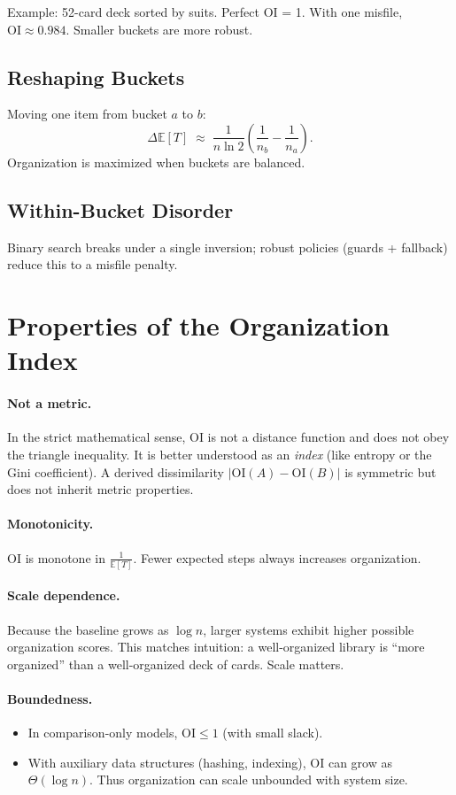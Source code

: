 \documentclass[11pt]{article}
\begin{document}
Example: 52-card deck sorted by suits. Perfect OI = 1. With one misfile,
$\mathrm{OI} \approx 0.984$. Smaller buckets are more robust.

\subsection{Reshaping Buckets}
Moving one item from bucket $a$ to $b$:
\[
\Delta \mathbb{E}[T] \;\approx\; \frac{1}{n\ln 2}
\left(\frac{1}{n_b} - \frac{1}{n_a}\right).
\]
Organization is maximized when buckets are balanced.

\subsection{Within-Bucket Disorder}
Binary search breaks under a single inversion; robust policies (guards +
fallback) reduce this to a misfile penalty.

\section{Properties of the Organization Index}
\paragraph{Not a metric.}
In the strict mathematical sense, $\mathrm{OI}$ is not a distance function and
does not obey the triangle inequality. It is better understood as an \emph{index}
(like entropy or the Gini coefficient). A derived dissimilarity
$|\mathrm{OI}(A)-\mathrm{OI}(B)|$ is symmetric but does not inherit metric
properties.

\paragraph{Monotonicity.}
$\mathrm{OI}$ is monotone in $\tfrac{1}{\mathbb{E}[T]}$. Fewer expected steps
always increases organization.

\paragraph{Scale dependence.}
Because the baseline grows as $\log n$, larger systems exhibit higher possible
organization scores. This matches intuition: a well-organized library is
``more organized'' than a well-organized deck of cards. Scale matters.

\paragraph{Boundedness.}
\begin{itemize}
  \item In comparison-only models, $\mathrm{OI}\leq 1$ (with small slack).
  \item With auxiliary data structures (hashing, indexing), $\mathrm{OI}$ can
  grow as $\Theta(\log n)$. Thus organization can scale unbounded with system
  size.
\end{itemize}
\end{document}
